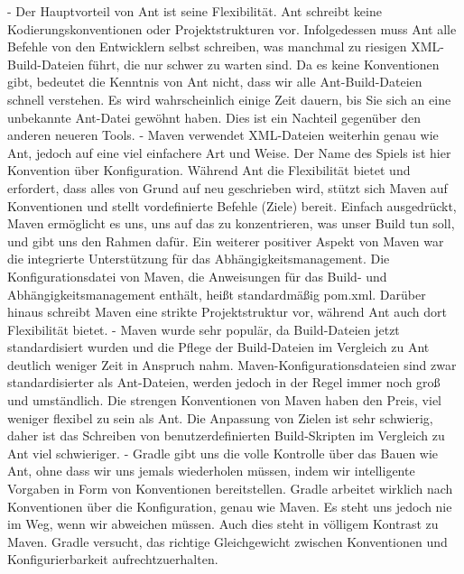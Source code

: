 		- Der Hauptvorteil von Ant ist seine Flexibilität. Ant schreibt keine Kodierungskonventionen oder Projektstrukturen vor. Infolgedessen muss Ant alle Befehle von den Entwicklern selbst schreiben, was manchmal zu riesigen XML-Build-Dateien führt, die nur schwer zu warten sind. Da es keine Konventionen gibt, bedeutet die Kenntnis von Ant nicht, dass wir alle Ant-Build-Dateien schnell verstehen. Es wird wahrscheinlich einige Zeit dauern, bis Sie sich an eine unbekannte Ant-Datei gewöhnt haben. Dies ist ein Nachteil gegenüber den anderen neueren Tools.
		- Maven verwendet XML-Dateien weiterhin genau wie Ant, jedoch auf eine viel einfachere Art und Weise. Der Name des Spiels ist hier Konvention über Konfiguration. Während Ant die Flexibilität bietet und erfordert, dass alles von Grund auf neu geschrieben wird, stützt sich Maven auf Konventionen und stellt vordefinierte Befehle (Ziele) bereit. Einfach ausgedrückt, Maven ermöglicht es uns, uns auf das zu konzentrieren, was unser Build tun soll, und gibt uns den Rahmen dafür. Ein weiterer positiver Aspekt von Maven war die integrierte Unterstützung für das Abhängigkeitsmanagement. Die Konfigurationsdatei von Maven, die Anweisungen für das Build- und Abhängigkeitsmanagement enthält, heißt standardmäßig pom.xml. Darüber hinaus schreibt Maven eine strikte Projektstruktur vor, während Ant auch dort Flexibilität bietet.
		-  Maven wurde sehr populär, da Build-Dateien jetzt standardisiert wurden und die Pflege der Build-Dateien im Vergleich zu Ant deutlich weniger Zeit in Anspruch nahm. Maven-Konfigurationsdateien sind zwar standardisierter als Ant-Dateien, werden jedoch in der Regel immer noch groß und umständlich. Die strengen Konventionen von Maven haben den Preis, viel weniger flexibel zu sein als Ant. Die Anpassung von Zielen ist sehr schwierig, daher ist das Schreiben von benutzerdefinierten Build-Skripten im Vergleich zu Ant viel schwieriger.
		- Gradle gibt uns die volle Kontrolle über das Bauen wie Ant, ohne dass wir uns jemals wiederholen müssen, indem wir intelligente Vorgaben in Form von Konventionen bereitstellen. Gradle arbeitet wirklich nach Konventionen über die Konfiguration, genau wie Maven. Es steht uns jedoch nie im Weg, wenn wir abweichen müssen. Auch dies steht in völligem Kontrast zu Maven. Gradle versucht, das richtige Gleichgewicht zwischen Konventionen und Konfigurierbarkeit aufrechtzuerhalten.

